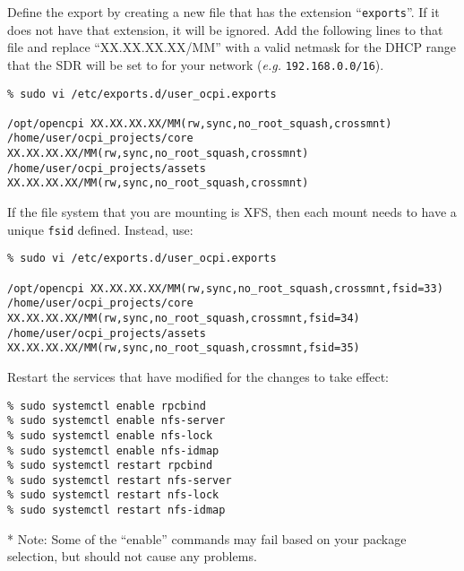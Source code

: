 Define the export by creating a new file that has the extension ``\texttt{exports}''. If it does not have that extension, it will be ignored.  Add the following lines to that file and replace ``XX.XX.XX.XX/MM'' with a valid netmask for the DHCP range that the SDR will be set to for your network (\textit{e.g.} \texttt{192.168.0.0/16}).
\begin{verbatim}
% sudo vi /etc/exports.d/user_ocpi.exports

/opt/opencpi XX.XX.XX.XX/MM(rw,sync,no_root_squash,crossmnt)
/home/user/ocpi_projects/core XX.XX.XX.XX/MM(rw,sync,no_root_squash,crossmnt)
/home/user/ocpi_projects/assets XX.XX.XX.XX/MM(rw,sync,no_root_squash,crossmnt)
\end{verbatim}

If the file system that you are mounting is XFS, then each mount needs to have a unique \texttt{fsid} defined. Instead, use:
\begin{verbatim}
% sudo vi /etc/exports.d/user_ocpi.exports

/opt/opencpi XX.XX.XX.XX/MM(rw,sync,no_root_squash,crossmnt,fsid=33)
/home/user/ocpi_projects/core XX.XX.XX.XX/MM(rw,sync,no_root_squash,crossmnt,fsid=34)
/home/user/ocpi_projects/assets XX.XX.XX.XX/MM(rw,sync,no_root_squash,crossmnt,fsid=35)
\end{verbatim}

Restart the services that have modified for the changes to take effect:
\begin{verbatim}
% sudo systemctl enable rpcbind
% sudo systemctl enable nfs-server
% sudo systemctl enable nfs-lock
% sudo systemctl enable nfs-idmap
% sudo systemctl restart rpcbind
% sudo systemctl restart nfs-server
% sudo systemctl restart nfs-lock
% sudo systemctl restart nfs-idmap
\end{verbatim}

* Note: Some of the ``enable'' commands may fail based on your package selection, but should not cause any problems.
\setlength{\parindent}{\savedparindentnfs}%
